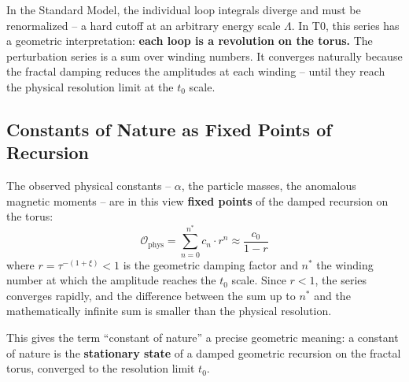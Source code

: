 	In the Standard Model, the individual loop integrals diverge and must be renormalized -- a hard cutoff at an arbitrary energy scale $\Lambda$. In T0, this series has a geometric interpretation: \textbf{each loop is a revolution on the torus.} The perturbation series is a sum over winding numbers. It converges naturally because the fractal damping reduces the amplitudes at each winding -- until they reach the physical resolution limit at the $t_0$ scale.
	
	\begin{table}[h]
		\centering
		\caption{Loop diagrams in the SM vs.\ windings in T0}
		\label{tab:loops}
	\end{table}
	
	\subsection{Constants of Nature as Fixed Points of Recursion}
	
	The observed physical constants -- $\alpha$, the particle masses, the anomalous magnetic moments -- are in this view \textbf{fixed points} of the damped recursion on the torus:
	\begin{equation}
		\mathcal{O}_\text{phys} = \sum_{n=0}^{n^*} c_n \cdot r^n \approx \frac{c_0}{1 - r}
	\end{equation}
	where $r = \tau^{-(1+\xi)} < 1$ is the geometric damping factor and $n^*$ the winding number at which the amplitude reaches the $t_0$ scale. Since $r < 1$, the series converges rapidly, and the difference between the sum up to $n^*$ and the mathematically infinite sum is smaller than the physical resolution.
	
	This gives the term ``constant of nature'' a precise geometric meaning: a constant of nature is the \textbf{stationary state} of a damped geometric recursion on the fractal torus, converged to the resolution limit $t_0$.
	
